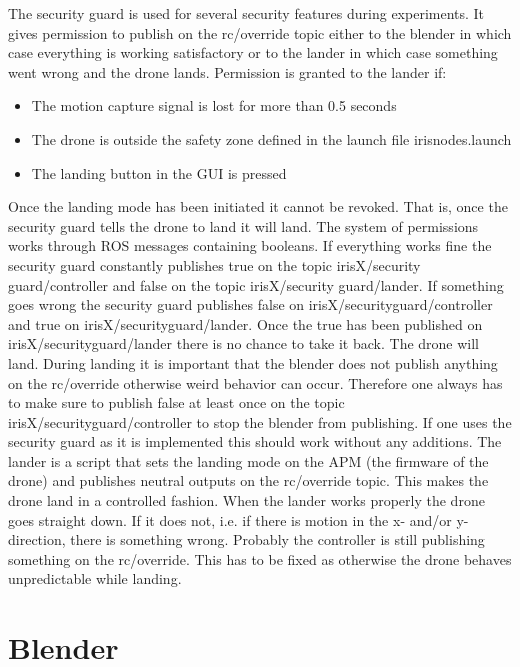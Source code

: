 \documentclass[titlepage,11pt,a4paper]{article}
\begin{document}
The security guard is used for several security features during
experiments. It gives permission to publish on the rc/override topic
either to the blender in which case everything is working satisfactory
or to the lander in which case something went wrong and the drone
lands. Permission is granted to the lander if:
\begin{itemize}
  \item The motion capture signal is lost for more than 0.5 seconds
  \item The drone is outside the safety zone defined in the launch
    file iris\textunderscore nodes.launch
  \item The landing button in the GUI is pressed
\end{itemize}
Once the landing mode has been initiated it cannot be revoked. That
is, once the security guard tells the drone to land it will land.  The
system of permissions works through ROS messages containing
booleans. If everything works fine the security guard constantly
publishes true on the topic irisX/security\textunderscore
guard/controller and false on the topic irisX/security\textunderscore
guard/lander. If something goes wrong the security guard publishes
false on irisX/security\textunderscore guard/controller and true on
irisX/security\textunderscore guard/lander. Once the true has been
published on irisX/security\textunderscore guard/lander there is no
chance to take it back. The drone will land. During landing it is
important that the blender does not publish anything on the
rc/override otherwise weird behavior can occur. Therefore one always
has to make sure to publish false at least once on the topic
irisX/security\textunderscore guard/controller to stop the blender
from publishing. If one uses the security guard as it is implemented
this should work without any additions.  The lander is a script that
sets the landing mode on the APM (the firmware of the drone) and
publishes neutral outputs on the rc/override topic. This makes the
drone land in a controlled fashion. When the lander works properly the
drone goes straight down. If it does not, i.e. if there is motion in
the x- and/or y-direction, there is something wrong. Probably the
controller is still publishing something on the rc/override. This has
to be fixed as otherwise the drone behaves unpredictable while
landing.


\section{Blender}
\label{sec:blender}
\end{document}
